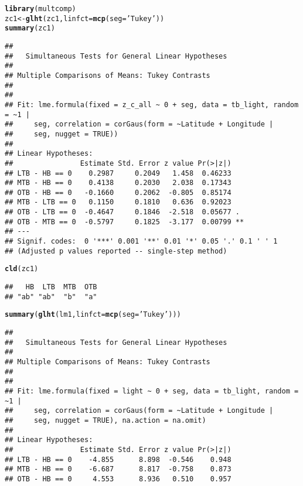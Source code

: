 \documentclass[letterpaper,12pt]{article}\usepackage[]{graphicx}\usepackage[]{color}
\makeatletter
\newcommand{\hlstr}[1]{\textcolor[rgb]{0.192,0.494,0.8}{#1}}%
\newcommand{\hlstd}[1]{\textcolor[rgb]{0.345,0.345,0.345}{#1}}%
\newcommand{\hlkwb}[1]{\textcolor[rgb]{0.69,0.353,0.396}{#1}}%
\newcommand{\hlkwc}[1]{\textcolor[rgb]{0.333,0.667,0.333}{#1}}%
\newcommand{\hlkwd}[1]{\textcolor[rgb]{0.737,0.353,0.396}{\textbf{#1}}}%
\newenvironment{kframe}{%
 \def\at@end@of@kframe{}%
 \ifinner\ifhmode%
  \def\at@end@of@kframe{\end{minipage}}%
  \begin{minipage}{\columnwidth}%
 \fi\fi%
 \def\FrameCommand##1{\hskip\@totalleftmargin \hskip-\fboxsep
 \colorbox{shadecolor}{##1}\hskip-\fboxsep
     \hskip-\linewidth \hskip-\@totalleftmargin \hskip\columnwidth}%
 \MakeFramed {\advance\hsize-\width
   \@totalleftmargin\z@ \linewidth\hsize
   \@setminipage}}%
 {\par\unskip\endMakeFramed%
 \at@end@of@kframe}
\newenvironment{knitrout}{}{} %
\makeatother
\begin{document}
\clearpage
\begin{knitrout}
\color{fgcolor}\begin{kframe}
\begin{alltt}
\hlkwd{library}\hlstd{(multcomp)}
\hlstd{zc1} \hlkwb{<-} \hlkwd{glht}\hlstd{(zc1,} \hlkwc{linfct} \hlstd{=} \hlkwd{mcp}\hlstd{(}\hlkwc{seg} \hlstd{=} \hlstr{'Tukey'}\hlstd{))}
\hlkwd{summary}\hlstd{(zc1)}
\end{alltt}
\begin{verbatim}
## 
## 	 Simultaneous Tests for General Linear Hypotheses
## 
## Multiple Comparisons of Means: Tukey Contrasts
## 
## 
## Fit: lme.formula(fixed = z_c_all ~ 0 + seg, data = tb_light, random = ~1 | 
##     seg, correlation = corGaus(form = ~Latitude + Longitude | 
##     seg, nugget = TRUE))
## 
## Linear Hypotheses:
##                Estimate Std. Error z value Pr(>|z|)   
## LTB - HB == 0    0.2987     0.2049   1.458  0.46233   
## MTB - HB == 0    0.4138     0.2030   2.038  0.17343   
## OTB - HB == 0   -0.1660     0.2062  -0.805  0.85174   
## MTB - LTB == 0   0.1150     0.1810   0.636  0.92023   
## OTB - LTB == 0  -0.4647     0.1846  -2.518  0.05677 . 
## OTB - MTB == 0  -0.5797     0.1825  -3.177  0.00799 **
## ---
## Signif. codes:  0 '***' 0.001 '**' 0.01 '*' 0.05 '.' 0.1 ' ' 1
## (Adjusted p values reported -- single-step method)
\end{verbatim}
\begin{alltt}
\hlkwd{cld}\hlstd{(zc1)}
\end{alltt}
\begin{verbatim}
##   HB  LTB  MTB  OTB 
## "ab" "ab"  "b"  "a"
\end{verbatim}
\begin{alltt}
\hlkwd{summary}\hlstd{(}\hlkwd{glht}\hlstd{(lm1,} \hlkwc{linfct} \hlstd{=} \hlkwd{mcp}\hlstd{(}\hlkwc{seg} \hlstd{=} \hlstr{'Tukey'}\hlstd{)))}
\end{alltt}
\begin{verbatim}
## 
## 	 Simultaneous Tests for General Linear Hypotheses
## 
## Multiple Comparisons of Means: Tukey Contrasts
## 
## 
## Fit: lme.formula(fixed = light ~ 0 + seg, data = tb_light, random = ~1 | 
##     seg, correlation = corGaus(form = ~Latitude + Longitude | 
##     seg, nugget = TRUE), na.action = na.omit)
## 
## Linear Hypotheses:
##                Estimate Std. Error z value Pr(>|z|)
## LTB - HB == 0    -4.855      8.898  -0.546    0.948
## MTB - HB == 0    -6.687      8.817  -0.758    0.873
## OTB - HB == 0     4.553      8.936   0.510    0.957

\end{verbatim}
\end{kframe}
\end{knitrout}
\end{document}
